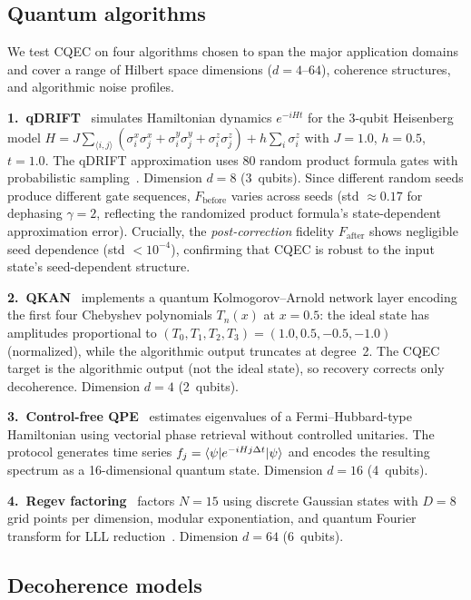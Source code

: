 \documentclass[prx,twocolumn,superscriptaddress,longbibliography,floatfix]{revtex4-2}
\begin{document}
\subsection{Quantum algorithms}
\label{sec:algorithms}

We test CQEC on four algorithms chosen to span the major application domains and cover a range of Hilbert space dimensions ($d = 4$--$64$), coherence structures, and algorithmic noise profiles.

\textbf{1.\ qDRIFT}~\cite{Campbell2019,Chen2021} simulates Hamiltonian dynamics $e^{-iHt}$ for the 3-qubit Heisenberg model $H = J \sum_{\langle i,j \rangle} (\sigma_i^x \sigma_j^x + \sigma_i^y \sigma_j^y + \sigma_i^z \sigma_j^z) + h \sum_i \sigma_i^z$ with $J = 1.0$, $h = 0.5$, $t = 1.0$.
The qDRIFT approximation uses 80 random product formula gates with probabilistic sampling~\cite{Campbell2019}.
Dimension $d = 8$ (3~qubits).
Since different random seeds produce different gate sequences, $F_\mathrm{before}$ varies across seeds (std $\approx 0.17$ for dephasing $\gamma = 2$, reflecting the randomized product formula's state-dependent approximation error).
Crucially, the \emph{post-correction} fidelity $F_\mathrm{after}$ shows negligible seed dependence (std $< 10^{-4}$), confirming that CQEC is robust to the input state's seed-dependent structure.

\textbf{2.\ QKAN}~\cite{Ivashkov2024} implements a quantum Kolmogorov--Arnold network layer encoding the first four Chebyshev polynomials $T_n(x)$ at $x = 0.5$: the ideal state has amplitudes proportional to $(T_0, T_1, T_2, T_3) = (1.0, 0.5, -0.5, -1.0)$ (normalized), while the algorithmic output truncates at degree~2.
The CQEC target is the algorithmic output (not the ideal state), so recovery corrects only decoherence.
Dimension $d = 4$ (2~qubits).

\textbf{3.\ Control-free QPE}~\cite{Clinton2026} estimates eigenvalues of a Fermi--Hubbard-type Hamiltonian using vectorial phase retrieval without controlled unitaries.
The protocol generates time series $f_j = \braket{\psi | e^{-iHj\Delta t} | \psi}$ and encodes the resulting spectrum as a 16-dimensional quantum state.
Dimension $d = 16$ (4~qubits).

\textbf{4.\ Regev factoring}~\cite{Regev2024} factors $N = 15$ using discrete Gaussian states with $D = 8$ grid points per dimension, modular exponentiation, and quantum Fourier transform for LLL reduction~\cite{LLL1982}.
Dimension $d = 64$ (6~qubits).


\subsection{Decoherence models}
\label{sec:noise}
\end{document}
